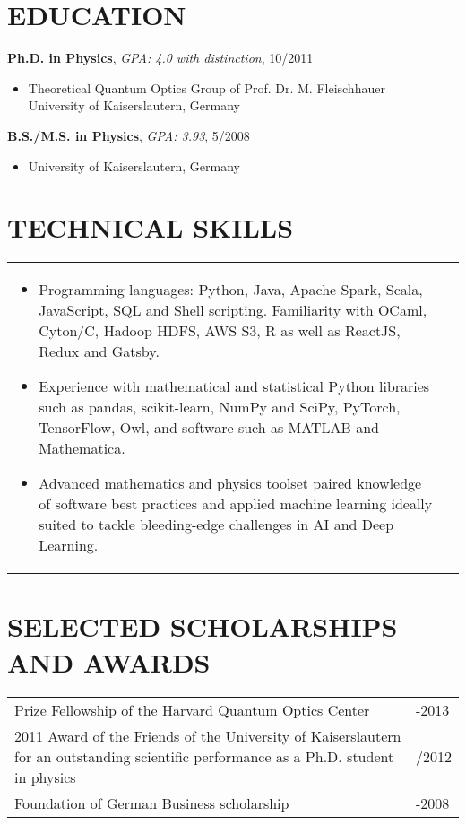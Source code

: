 \documentclass[10pt,centered]{./res} %
\begin{document}
\begin{resume}
\section{\color{ResumeBlue}EDUCATION}

{\bf Ph.D. in Physics}, {\it GPA: 4.0 with distinction}, 10/2011
\begin{itemize}
 \item[] Theoretical Quantum Optics Group of Prof. Dr. M. Fleischhauer\\ University of Kaiserslautern, Germany
\end{itemize}
\vspace*{-0.2cm}
{\bf B.S./M.S. in Physics}, {\it GPA: 3.93}, 5/2008
\begin{itemize}
 \item[] University of Kaiserslautern, Germany
\end{itemize}

\section{\color{ResumeBlue}TECHNICAL SKILLS}

\vspace*{0.2cm}
\hspace*{-.9cm}
\begin{tabular}{p{5.85in}>{\raggedleft\arraybackslash}p{.1in}}
\begin{itemize}
  \item Programming languages: Python, Java, Apache Spark, Scala, JavaScript, SQL and Shell scripting. Familiarity with OCaml, Cyton/C, Hadoop HDFS, AWS S3, R as well as ReactJS, Redux and Gatsby.
  \item Experience with mathematical and statistical Python libraries such as pandas, scikit-learn, NumPy and SciPy, PyTorch, TensorFlow, Owl, and software such as MATLAB and {\sc Mathematica}.
  \item Advanced mathematics and physics toolset paired knowledge of software best practices and applied machine learning ideally suited to tackle bleeding-edge challenges in AI and Deep Learning.
\end{itemize}
 & \\
\end{tabular}

\vspace*{-0.2cm}
\section{\color{ResumeBlue}SELECTED SCHOLARSHIPS AND AWARDS}
\vspace*{0.2cm}
\hspace*{-.3cm}
\begin{tabular}{p{5.0in}>{\raggedleft\arraybackslash}p{.85in}}
  {Prize Fellowship} of the Harvard Quantum Optics Center
 &  2011-2013 \\
  {2011 Award} of the Friends of the University of Kaiserslautern for an outstanding scientific performance as a Ph.D. student in physics
 & 6/2012 \\
  {Foundation of German Business} scholarship
 & 2005-2008 \\
\end{tabular}


\end{resume}
\end{document}

